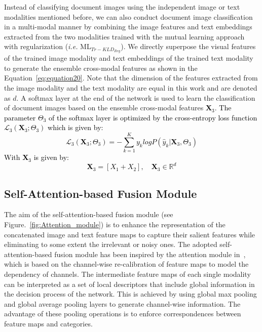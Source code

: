 \documentclass[twocolumn]{svjour3}
\newcommand{\ie}{\textit{i.e. }}
\begin{document}
Instead of classifying document images using the independent image or text modalities mentioned before, we can also conduct document image classification in a multi-modal manner by combining the image features and text embeddings extracted from the two modalities trained with the mutual learning approach with regularization (\ie ML$_{{Tr-KLD}_{Reg}}$).
We directly superpose the visual features of the trained image modality and text embeddings of the trained text modality to generate the ensemble cross-modal features as shown in the Equation~\ref{eq:equation20}.
Note that the dimension of the features extracted from the image modality and the text modality are equal in this work and are denoted as $d$. A softmax layer at the end of the network is used to learn the classification of document images based on the ensemble cross-modal features \textcolor{black}{$\mathbf{X}_3$. The parameter $\Theta_3$ of the softmax layer is optimized by the cross-entropy loss function $\mathcal{L}_3(\mathbf{X}_3;\Theta_3)$ which is given by:
\begin{equation}
 \mathcal{L}_3(\mathbf{X}_3;\Theta_3)=-\sum^{K}_{k=1}y_klogP(\hat y_k|\mathbf{X}_3,\Theta_3)
 \label{eq:equation19}
 \end{equation}
 }
 \textcolor{black}{With $\mathbf{X}_3$ is given by:}
\textcolor{black}{
 \begin{equation}
 \mathbf{X}_3 = [X_1+X_2] , \quad \mathbf{X}_3 \in \mathbb{R}^{d}
 \label{eq:equation20}
 \end{equation}
}


\subsection{Self-Attention-based Fusion Module}

The aim of the self-attention-based fusion module (see Figure.~\ref{fig:Attention_module}) is to enhance the representation of the concatenated image and text feature maps to capture their salient features while eliminating to some extent the irrelevant or noisy ones. The adopted self-attention-based fusion module has been inspired by the attention module in~\cite{vaswani2017attention, Hu_2018_CVPR}, which is based on the channel-wise re-calibration of feature maps to model the dependency of channels. The intermediate feature maps of each single modality can be interpreted as a set of local descriptors that include global information in the decision process of the network. This is achieved by using global max pooling and global average pooling layers to generate channel-wise information. The advantage of these pooling operations is to enforce correspondences between feature maps and categories. 
\end{document}
